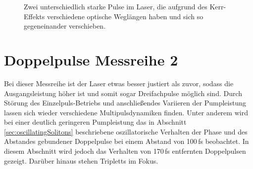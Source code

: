 \documentclass[bachelor,       %
               twoside,        %
               BCOR10mm,       %
               liststotoc,nomtotoc,bibtotoc, %
               english,ngerman, %
               final,          %
               ]{GAUBM}
\begin{document}
\begin{figure}[!htb]
   \centering   
   \hfill
   \caption{Zwei unterschiedlich starke Pulse im Laser, die aufgrund des Kerr-Effekts verschiedene optische Weglängen haben und sich so gegeneinander verschieben.}
   \label{fig:running441}
 \end{figure}


\section{Doppelpulse Messreihe 2}
Bei dieser Messreihe ist der Laser etwas besser justiert als zuvor, sodass die Ausgangsleistung höher ist und somit sogar Dreifachpulse möglich sind.
Durch Störung des Einzelpuls-Betriebs und anschließendes Variieren der Pumpleistung lassen sich wieder verschiedene Multipulsdynamiken finden.
Unter anderem wird bei einer deutlich geringeren Pumpleistung das in Abschnitt \ref{sec:oscillatingSolitons} beschriebene oszillatorische Verhalten der Phase und des Abstandes gebundener Doppelpulse bei einem Abstand von 100\,fs beobachtet.
In diesem Abschnitt wird jedoch das Verhalten von 170\,fs entfernten Doppelpulsen gezeigt.
Darüber hinaus stehen Tripletts im Fokus.
\end{document}
